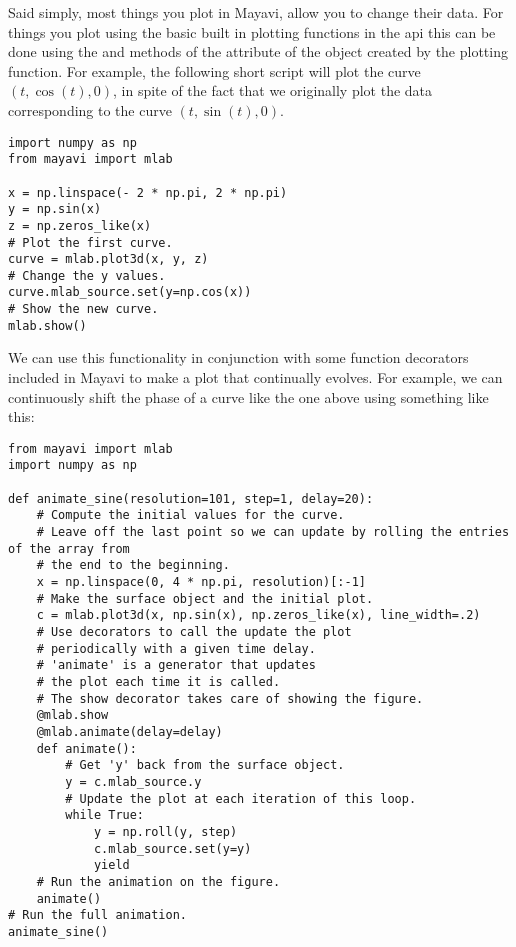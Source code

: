 Said simply, most things you plot in Mayavi, allow you to change their data.
For things you plot using the basic built in plotting functions in the  api this can be done using the  and  methods of the  attribute of the object created by the plotting function.
For example, the following short script will plot the curve $(t, \cos(t), 0)$, in spite of the fact that we originally plot the data corresponding to the curve $(t, \sin(t), 0)$.
\begin{lstlisting}
import numpy as np
from mayavi import mlab

x = np.linspace(- 2 * np.pi, 2 * np.pi)
y = np.sin(x)
z = np.zeros_like(x)
# Plot the first curve.
curve = mlab.plot3d(x, y, z)
# Change the y values.
curve.mlab_source.set(y=np.cos(x))
# Show the new curve.
mlab.show()
\end{lstlisting}

We can use this functionality in conjunction with some function decorators included in Mayavi to make a plot that continually evolves.
For example, we can continuously shift the phase of a curve like the one above using something like this:
\begin{lstlisting}
from mayavi import mlab
import numpy as np

def animate_sine(resolution=101, step=1, delay=20):
    # Compute the initial values for the curve.
    # Leave off the last point so we can update by rolling the entries of the array from
    # the end to the beginning.
    x = np.linspace(0, 4 * np.pi, resolution)[:-1]
    # Make the surface object and the initial plot.
    c = mlab.plot3d(x, np.sin(x), np.zeros_like(x), line_width=.2)
    # Use decorators to call the update the plot
    # periodically with a given time delay.
    # 'animate' is a generator that updates
    # the plot each time it is called.
    # The show decorator takes care of showing the figure.
    @mlab.show
    @mlab.animate(delay=delay)
    def animate():
        # Get 'y' back from the surface object.
        y = c.mlab_source.y
        # Update the plot at each iteration of this loop.
        while True:
            y = np.roll(y, step)
            c.mlab_source.set(y=y)
            yield
    # Run the animation on the figure.
    animate()
# Run the full animation.
animate_sine()
\end{lstlisting}

